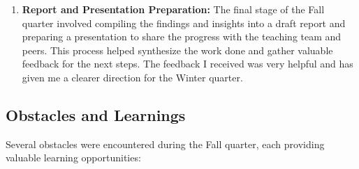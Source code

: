 \documentclass[12pt, letterpaper]{article}
\begin{document}
\begin{enumerate}
    \item \textbf{Report and Presentation Preparation:} The final stage of the Fall quarter involved compiling the findings and insights into a draft report and preparing a presentation to share the progress with the teaching team and peers. This process helped synthesize the work done and gather valuable feedback for the next steps. The feedback I received was very helpful and has given me a clearer direction for the Winter quarter.
\end{enumerate}

\subsection{Obstacles and Learnings}

Several obstacles were encountered during the Fall quarter, each providing valuable learning opportunities:
\end{document}
